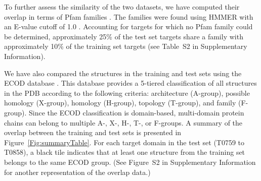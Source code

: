 \documentclass{bioinfo}
\begin{document}
To further assess the similarity of the two datasets, we have computed
their overlap in terms of Pfam families \citep{finn2016pfam}. 
The families were found using HMMER \citep{finn2015hmmer} with an E-value
cutoff of 1.0 \citep{finn2016pfam}.  Accounting for targets for which
no Pfam family could be determined, approximately 25\% of the test set
targets share a family with approximately 10\% of the training set
targets (see Table~S2 in Supplementary Information).

We have also compared the structures in the training and test sets
using the ECOD database \citep{cheng2014ecod}. This database provides a
5-tiered classification of all structures in the PDB
according to the following criteria:
architecture (A-group), possible homology (X-group), homology
(H-group), topology (T-group), and family (F-group).  Since the ECOD
classification is domain-based, multi-domain protein chains can belong
to multiple A-, X-, H-, T-, or F-groups.
%
A summary of the overlap between the training and test sets is
presented in Figure~\ref{Fig:summaryTable}. For each target domain in
the test set (T0759 to T0858), a black tile indicates that at least
one structure from the training set belongs to the same ECOD
group. (See Figure~S2 in Supplementary Information for another
representation of the overlap data.)
\end{document}
